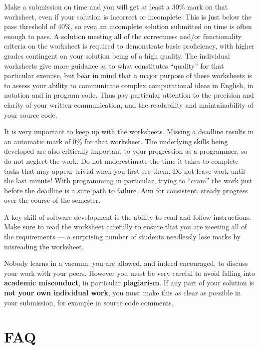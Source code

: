 \documentclass{../../fal_assignment}
\begin{document}
Make a submission on time and you will get at least a 30\% mark on that worksheet,
even if your solution is incorrect or incomplete.
This is just below the pass threshold of 40\%, so even an incomplete solution submitted on time is often enough to pass.
A solution meeting all of the correctness and/or functionality criteria on the worksheet is required to demonstrate basic proficiency,
with higher grades contingent on your solution being of a high quality.
The individual worksheets give more guidance as to what constitutes ``quality'' for that particular exercise,
but bear in mind that a major purpose of these worksheets is to assess your ability to communicate
complex computational ideas in English, in notation and in program code.
Thus pay particular attention to the precision and clarity of your written communication,
and the readability and maintainability of your source code.

It is very important to keep up with the worksheets. Missing a deadline results in an automatic mark of 0\% for that worksheet.
The underlying skills being developed are also critically important to your progression as a programmer, so do not neglect the work.
Do not underestimate the time it takes to complete tasks that may appear trivial when you first see them.
Do not leave work until the last minute! With programming in particular, trying to ``cram'' the work just before the deadline is a sure path to failure. Aim for consistent, steady progress over the course of the semester.

A key skill of software development is the ability to read and follow instructions.
Make sure to read the worksheet carefully to ensure that you are meeting all of the requirements ---
a surprising number of students needlessly lose marks by misreading the worksheet.

Nobody learns in a vacuum: you are allowed, and indeed encouraged, to discuss your work with your peers. However you must be very careful to avoid falling into \textbf{academic misconduct}, in particular \textbf{plagiarism}. If any part of your solution is \textbf{not your own individual work}, you must make this as clear as possible in your submission, for example in source code comments.

\section*{FAQ}
\end{document}
